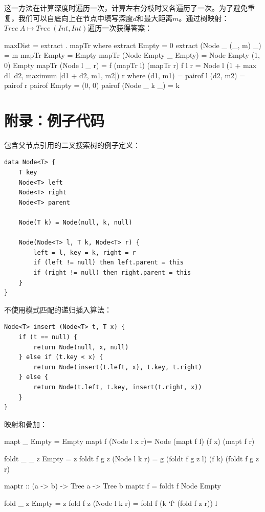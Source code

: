 \documentclass[b5paper]{ctexart}
\begin{document}
\begin{Answer}[ref={ex:bst-delete}]
{这一方法在计算深度时遍历一次，计算左右分枝时又各遍历了一次。为了避免重复，我们可以自底向上在节点中填写深度$d$和最大距离$m$。通过树映射：$Tree\ A \mapsto Tree\ (Int, Int)$遍历一次获得答案：

\begin{Haskell}
maxDist = extract . mapTr where
  extract Empty = 0
  extract (Node _ (_, m) _) = m
  mapTr Empty = Empty
  mapTr (Node Empty _ Empty) = Node Empty (1, 0) Empty
  mapTr (Node l _ r) = f (mapTr l) (mapTr r)
  f l r = Node l (1 + max d1 d2, maximum [d1 + d2, m1, m2]) r where
    (d1, m1) = pairof l
    (d2, m2) = pairof r
    pairof Empty = (0, 0)
    pairof (Node _ k _) = k
\end{Haskell}
}
\end{Answer}

\section{附录：例子代码}

包含父节点引用的二叉搜索树的例子定义：

\lstset{language=Bourbaki, frame=single}
\begin{lstlisting}
data Node<T> {
    T key
    Node<T> left
    Node<T> right
    Node<T> parent

    Node(T k) = Node(null, k, null)

    Node(Node<T> l, T k, Node<T> r) {
        left = l, key = k, right = r
        if (left != null) then left.parent = this
        if (right != null) then right.parent = this
    }
}
\end{lstlisting}

不使用模式匹配的递归插入算法：

\begin{lstlisting}
Node<T> insert (Node<T> t, T x) {
    if (t == null) {
        return Node(null, x, null)
    } else if (t.key < x) {
        return Node(insert(t.left, x), t.key, t.right)
    } else {
        return Node(t.left, t.key, insert(t.right, x))
    }
}
\end{lstlisting}

映射和叠加：
\begin{Haskell}
mapt _ Empty = Empty
mapt f (Node l x r)= Node (mapt f l) (f x) (mapt f r)

foldt _ _ z Empty = z
foldt f g z (Node l k r) = g (foldt f g z l) (f k) (foldt f g z r)

maptr :: (a -> b) -> Tree a -> Tree b
maptr f = foldt f Node Empty

fold _ z Empty = z
fold f z (Node l k r) = fold f (k `f` (fold f z r)) l
\end{Haskell}
\end{document}
